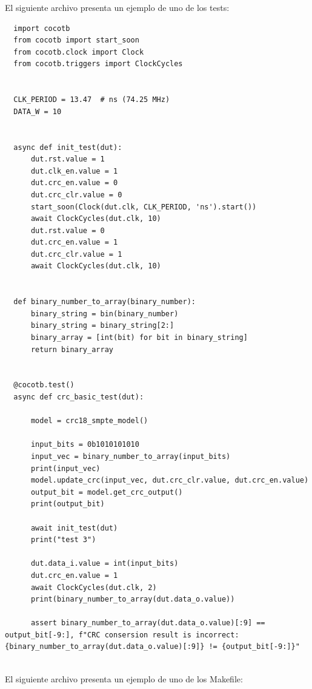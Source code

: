 El siguiente archivo presenta un ejemplo de uno de los tests:

{\scriptsize\begin{verbatim}
  import cocotb
  from cocotb import start_soon
  from cocotb.clock import Clock
  from cocotb.triggers import ClockCycles
  
  
  CLK_PERIOD = 13.47  # ns (74.25 MHz)
  DATA_W = 10
  
  
  async def init_test(dut):
      dut.rst.value = 1
      dut.clk_en.value = 1
      dut.crc_en.value = 0
      dut.crc_clr.value = 0
      start_soon(Clock(dut.clk, CLK_PERIOD, 'ns').start())
      await ClockCycles(dut.clk, 10)
      dut.rst.value = 0
      dut.crc_en.value = 1
      dut.crc_clr.value = 1
      await ClockCycles(dut.clk, 10)
  
  
  def binary_number_to_array(binary_number):
      binary_string = bin(binary_number)
      binary_string = binary_string[2:]
      binary_array = [int(bit) for bit in binary_string]
      return binary_array
  
  
  @cocotb.test()
  async def crc_basic_test(dut):
  
      model = crc18_smpte_model()
  
      input_bits = 0b1010101010
      input_vec = binary_number_to_array(input_bits)
      print(input_vec)
      model.update_crc(input_vec, dut.crc_clr.value, dut.crc_en.value)
      output_bit = model.get_crc_output()
      print(output_bit)
  
      await init_test(dut)
      print("test 3")
  
      dut.data_i.value = int(input_bits)
      dut.crc_en.value = 1
      await ClockCycles(dut.clk, 2)
      print(binary_number_to_array(dut.data_o.value))
  
      assert binary_number_to_array(dut.data_o.value)[:9] == output_bit[-9:], f"CRC consersion result is incorrect: {binary_number_to_array(dut.data_o.value)[:9]} != {output_bit[-9:]}"
  
\end{verbatim}}

El siguiente archivo presenta un ejemplo de uno de los Makefile:

